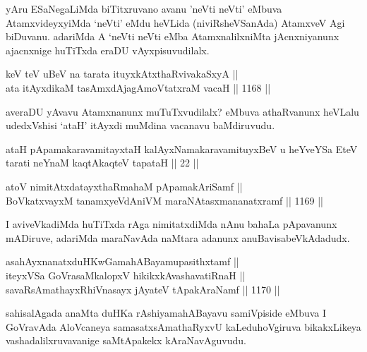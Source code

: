 \begin{artha}
yAru ESaNegaLiMda biTitxruvano avanu 'neVti neVti' eMbuva AtamxvideyxyiMda `neVti' eMdu heVLida (niviRsheVSanAda) AtamxveV Agi biDuvanu. adariMda A `neVti neVti eMba AtamxnalilxniMta jAcnxniyanunx ajacnxnige huTiTxda eraDU vAyxpisuvudilalx.
\end{artha}

\begin{shl}
keV teV uBeV na tarata ituyxkAtxthaRvivakaSxyA ||  \\
ata itAyxdikaM tasAmxdAjagAmoVtatxraM vacaH ||  1168 ||  
\end{shl}

\begin{artha}
averaDU yAvavu Atamxnanunx muTuTxvudilalx? eMbuva athaRvanunx heVLalu udedxVshisi `ataH' itAyxdi muMdina vacanavu baMdiruvudu.
\end{artha}


\begin{shl}
ataH pApamakaravamitayxtaH kalAyxNamakaravamituyxBeV u heYveYSa EteV tarati neYnaM kaqtAkaqteV tapataH || 22 ||
\end{shl}


\begin{shl}
atoV nimitAtxdatayxthaRmahaM pApamakAriSamf || \\
BoVkatxvayxM tanamxyeVdAniVM maraNAtasxmananatxramf ||  1169 ||  
\end{shl}

\begin{artha}
I aviveVkadiMda huTiTxda rAga nimitatxdiMda nAnu bahaLa pApavanunx mADiruve, adariMda maraNavAda naMtara adanunx  anuBavisabeVkAdadudx.
\end{artha}

\begin{shl}
asahAyxnanatxduHKwGamahABayamupasithxtamf || \\
iteyxVSa GoVrasaMkalopxV hikikxkAvashavatiRnaH || \\
savaRsAmathayxRhiVnasayx jAyateV tApakAraNamf ||  1170 ||  
\end{shl}

\begin{artha}
sahisalAgada anaMta duHKa rAshiyamahABayavu samiVpiside eMbuva I GoVravAda  AloVcaneya samasatxsAmathaRyxvU kaLeduhoVgiruva bikakxLikeya vashadalilxruvavanige saMtApakekx kAraNavAguvudu.
\end{artha}

